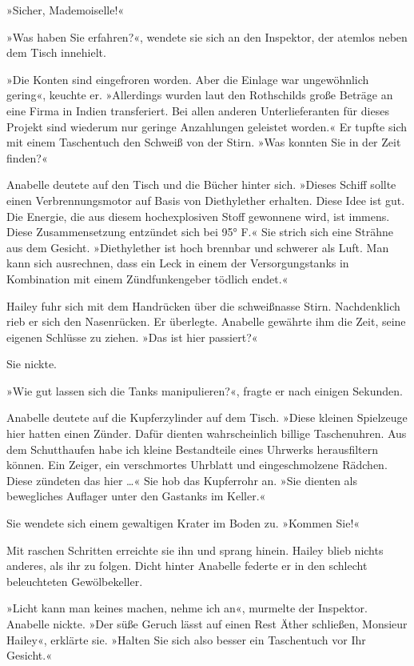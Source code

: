 »Sicher, Mademoiselle!«

»Was haben Sie erfahren?«, wendete sie sich an den Inspektor, der
atemlos neben dem Tisch innehielt.

»Die Konten sind eingefroren worden. Aber die Einlage war
ungewöhnlich gering«, keuchte er. »Allerdings wurden laut den
Rothschilds große Beträge an eine Firma in Indien transferiert. Bei
allen anderen Unterlieferanten für dieses Projekt sind wiederum nur
geringe Anzahlungen geleistet worden.« Er tupfte sich mit einem
Taschentuch den Schweiß von der Stirn. »Was konnten Sie in der Zeit
finden?«

Anabelle deutete auf den Tisch und die Bücher hinter sich. »Dieses
Schiff sollte einen Verbrennungsmotor auf Basis von Diethylether
erhalten. Diese Idee ist gut. Die Energie, die aus diesem
hochexplosiven Stoff gewonnene wird, ist immens. Diese
Zusammensetzung entzündet sich bei 95° F.« Sie strich sich eine
Strähne aus dem Gesicht. »Diethylether ist hoch brennbar und
schwerer als Luft. Man kann sich ausrechnen, dass ein Leck in einem
der Versorgungstanks in Kombination mit einem Zündfunkengeber
tödlich endet.«

Hailey fuhr sich mit dem Handrücken über die schweißnasse Stirn.
Nachdenklich rieb er sich den Nasenrücken. Er überlegte. Anabelle
gewährte ihm die Zeit, seine eigenen Schlüsse zu ziehen. »Das ist
hier passiert?«

Sie nickte.

»Wie gut lassen sich die Tanks manipulieren?«, fragte er nach
einigen Sekunden.

Anabelle deutete auf die Kupferzylinder auf dem Tisch. »Diese
kleinen Spielzeuge hier hatten einen Zünder. Dafür dienten
wahrscheinlich billige Taschenuhren. Aus dem Schutthaufen habe ich
kleine Bestandteile eines Uhrwerks herausfiltern können. Ein
Zeiger, ein verschmortes Uhrblatt und eingeschmolzene Rädchen.
Diese zündeten das hier …« Sie hob das Kupferrohr an. »Sie dienten
als bewegliches Auflager unter den Gastanks im Keller.«

Sie wendete sich einem gewaltigen Krater im Boden zu. »Kommen
Sie!«

Mit raschen Schritten erreichte sie ihn und sprang hinein. Hailey
blieb nichts anderes, als ihr zu folgen. Dicht hinter Anabelle
federte er in den schlecht beleuchteten Gewölbekeller.

»Licht kann man keines machen, nehme ich an«, murmelte der
Inspektor. Anabelle nickte. »Der süße Geruch lässt auf einen Rest
Äther schließen, Monsieur Hailey«, erklärte sie. »Halten Sie sich
also besser ein Taschentuch vor Ihr Gesicht.«

